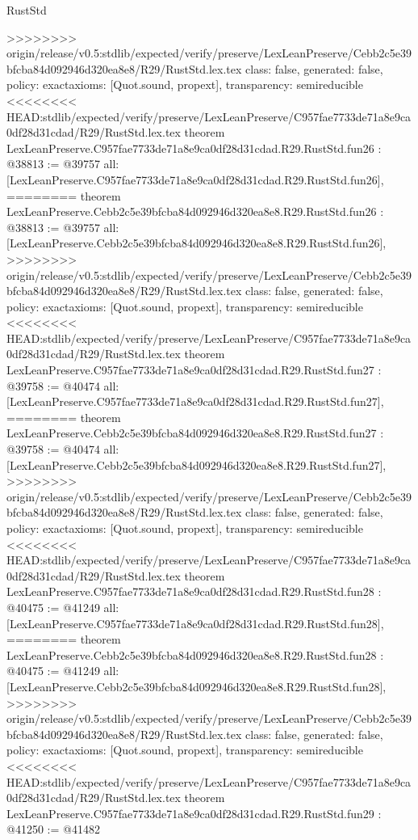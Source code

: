 \begin{lexlean}{RustStd}
\begin{coremodule}
{\begin{coremodule}
{{{{{{{{{{{{{{{{{{{{{{{{{{{{{>>>>>>>> origin/release/v0.5:stdlib/expected/verify/preserve/LexLeanPreserve/Cebb2c5e39bfcba84d092946d320ea8e8/R29/RustStd.lex.tex
  class: false,
  generated: false,
  policy: exact{axioms: [Quot.sound, propext]},
  transparency: semireducible
}
<<<<<<<< HEAD:stdlib/expected/verify/preserve/LexLeanPreserve/C957fae7733de71a8e9ca0df28d31cdad/R29/RustStd.lex.tex
theorem LexLeanPreserve.C957fae7733de71a8e9ca0df28d31cdad.R29.RustStd.fun26 : @38813 := @39757 {
  all: [LexLeanPreserve.C957fae7733de71a8e9ca0df28d31cdad.R29.RustStd.fun26],
========
theorem LexLeanPreserve.Cebb2c5e39bfcba84d092946d320ea8e8.R29.RustStd.fun26 : @38813 := @39757 {
  all: [LexLeanPreserve.Cebb2c5e39bfcba84d092946d320ea8e8.R29.RustStd.fun26],
>>>>>>>> origin/release/v0.5:stdlib/expected/verify/preserve/LexLeanPreserve/Cebb2c5e39bfcba84d092946d320ea8e8/R29/RustStd.lex.tex
  class: false,
  generated: false,
  policy: exact{axioms: [Quot.sound, propext]},
  transparency: semireducible
}
<<<<<<<< HEAD:stdlib/expected/verify/preserve/LexLeanPreserve/C957fae7733de71a8e9ca0df28d31cdad/R29/RustStd.lex.tex
theorem LexLeanPreserve.C957fae7733de71a8e9ca0df28d31cdad.R29.RustStd.fun27 : @39758 := @40474 {
  all: [LexLeanPreserve.C957fae7733de71a8e9ca0df28d31cdad.R29.RustStd.fun27],
========
theorem LexLeanPreserve.Cebb2c5e39bfcba84d092946d320ea8e8.R29.RustStd.fun27 : @39758 := @40474 {
  all: [LexLeanPreserve.Cebb2c5e39bfcba84d092946d320ea8e8.R29.RustStd.fun27],
>>>>>>>> origin/release/v0.5:stdlib/expected/verify/preserve/LexLeanPreserve/Cebb2c5e39bfcba84d092946d320ea8e8/R29/RustStd.lex.tex
  class: false,
  generated: false,
  policy: exact{axioms: [Quot.sound, propext]},
  transparency: semireducible
}
<<<<<<<< HEAD:stdlib/expected/verify/preserve/LexLeanPreserve/C957fae7733de71a8e9ca0df28d31cdad/R29/RustStd.lex.tex
theorem LexLeanPreserve.C957fae7733de71a8e9ca0df28d31cdad.R29.RustStd.fun28 : @40475 := @41249 {
  all: [LexLeanPreserve.C957fae7733de71a8e9ca0df28d31cdad.R29.RustStd.fun28],
========
theorem LexLeanPreserve.Cebb2c5e39bfcba84d092946d320ea8e8.R29.RustStd.fun28 : @40475 := @41249 {
  all: [LexLeanPreserve.Cebb2c5e39bfcba84d092946d320ea8e8.R29.RustStd.fun28],
>>>>>>>> origin/release/v0.5:stdlib/expected/verify/preserve/LexLeanPreserve/Cebb2c5e39bfcba84d092946d320ea8e8/R29/RustStd.lex.tex
  class: false,
  generated: false,
  policy: exact{axioms: [Quot.sound, propext]},
  transparency: semireducible
}
<<<<<<<< HEAD:stdlib/expected/verify/preserve/LexLeanPreserve/C957fae7733de71a8e9ca0df28d31cdad/R29/RustStd.lex.tex
theorem LexLeanPreserve.C957fae7733de71a8e9ca0df28d31cdad.R29.RustStd.fun29 : @41250 := @41482 {
}}}}}}}}}}}}}}}}}}}}}}}}}}}}}}}}
\end{coremodule}}
\end{coremodule}
\end{lexlean}

